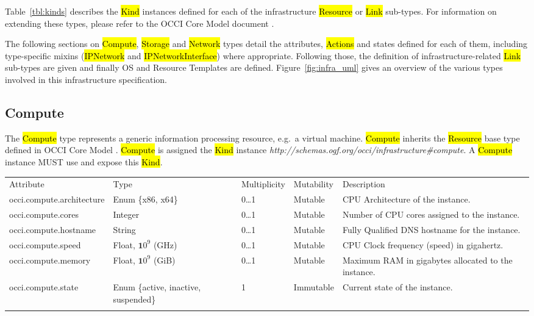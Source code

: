\documentclass[10pt,a4paper]{article}
\begin{document}
Table~\ref{tbl:kinds} describes the \hl{Kind} instances defined for each of the infrastructure \hl{Resource} 
or \hl{Link} sub-types.
%
For information on extending these types, please refer to the OCCI Core Model 
document \cite{occi:core}.

The following sections on \hl{Compute}, \hl{Storage} and \hl{Network} types detail the attributes, 
\hl{Actions} and states defined for each of them, including type-specific mixins (\hl{IPNetwork} 
and \hl{IPNetworkInterface}) where 
appropriate. Following those, the definition of infrastructure-related \hl{Link} sub-types 
are given and finally OS and Resource Templates are defined. Figure~\ref{fig:infra_uml} gives an overview
of the various types involved in this infrastructure specification.

\subsection{Compute}
The \hl{Compute} type represents a generic information processing resource, e.g.~a
virtual machine. \hl{Compute} inherits the \hl{Resource} base type defined in
OCCI Core Model \cite{occi:core}.
\hl{Compute} is assigned the \hl{Kind} instance
\textit{http://schemas.ogf.org/occi/infrastructure\#compute}.
A \hl{Compute} instance MUST use and expose this \hl{Kind}.


{
	\begin{tabular}{lp{2.5cm}p{1cm}lp{6cm}}
	\toprule
	Attribute&Type&Multi\-plicity&Mutability&Description\\
	\colrule
	occi.compute.architecture & Enum \{x86, x64\} & 0\ldots1 
	& Mutable & CPU Architecture of the instance.\\
	occi.compute.cores & Integer & 0\ldots1 & Mutable 
	& Number of CPU cores assigned to the instance.\\
	occi.compute.hostname & String & 0\ldots1 
	& Mutable & Fully Qualified DNS hostname for the instance.\\
	occi.compute.speed & Float, ${\mathbf 10}^9$ (GHz) & 0\ldots1 
	& Mutable & CPU Clock frequency (speed) in gigahertz.\\
	occi.compute.memory & Float, ${\mathbf 10}^9$ (GiB) & 0\ldots1 
	& Mutable & Maximum RAM in gigabytes allocated to the instance.\\
	occi.compute.state & Enum \{active, inactive, suspended\} & 1 
	& Immutable & Current state of the instance.\\
	\botrule
	\end{tabular}
}
\end{document}
